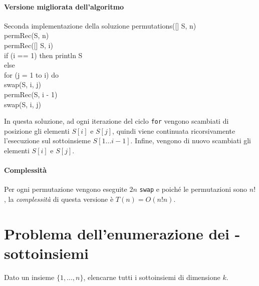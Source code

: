 \paragraph{Versione migliorata dell'algoritmo}
\begin{minicode}{Seconda implementazione della soluzione}
\ind permutations([] S,  n)\\
    permRec(S, n)\\

\ind permRec([] S,  i)\\
    \indf if (i == 1) then\hfill{}
        println S\\
    \indf else\\
        \indff for (j = 1 to i) do\\
            swap(S, i, j)\\
            permRec(S, i - 1)\\
            swap(S, i, j)\\
\end{minicode}

\noindent
In questa soluzione, ad ogni iterazione del ciclo \texttt{for} vengono scambiati
di posizione gli elementi $S[i]$ e $S[j]$, quindi viene continuata ricorsivamente
l'esecuzione sul sottoinsieme $S[1\dots i - 1]$. Infine, vengono di nuovo
scambiati gli elementi $S[i]$ e $S[j]$.

\paragraph{Complessità}
Per ogni permutazione vengono eseguite $2n$ \texttt{swap} e poiché le permutazioni
sono $n!$, la \emph{complessità} di questa versione è $T(n)=O(n!n)$.

\section[Problema dell'enumerazione dei k-sottoinsiemi]{Problema dell'enumerazione dei -sottoinsiemi}
\begin{problem}
    Dato  un insieme $\{1,\dots,n\}$, elencarne tutti i sottoinsiemi di
    dimensione $k$.
\end{problem}

